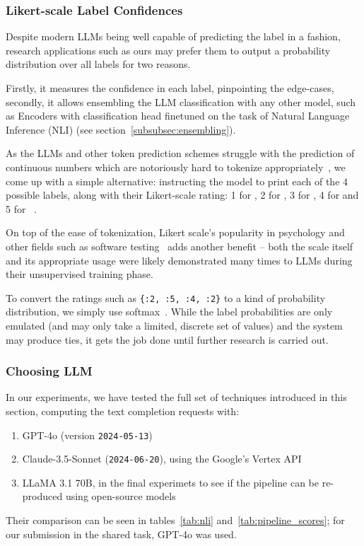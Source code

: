 \subsubsection{Likert-scale Label Confidences}
\label{likert}
Despite modern LLMs being well capable of predicting the label in a  fashion, research applications such as ours may prefer them to output a probability distribution over all labels for two reasons.

Firstly, it measures the confidence in each label, pinpointing the edge-cases, secondly, it allows ensembling the LLM classification with any other model, such as Encoders with classification head finetuned on the task of Natural Language Inference (NLI) (see section~\ref{subsubsec:ensembling}).

As the LLMs and other token prediction schemes struggle with the prediction of continuous numbers which are notoriously hard to tokenize appropriately~\cite{golkar2023xvalcontinuousnumberencoding}, we come up with a simple alternative: instructing the model to print each of the 4 possible labels, along with their Likert-scale rating: 1 for , 2 for , 3 for , 4 for  and 5 for ~\cite{likert1932technique}.

On top of the ease of tokenization, Likert scale's popularity in psychology and other fields such as software testing~\cite{likertstudy} adds another benefit -- both the scale itself and its appropriate usage were likely demonstrated many times to LLMs during their unsupervised training phase.

To convert the ratings such as \texttt{\{:2, :5, :4, :2\}} to a kind of probability distribution, we simply use softmax~\cite{NIPS1989_0336dcba}.
While the label probabilities are only emulated (and may only take a limited, discrete set of values) and the system may produce ties, it gets the job done until further research is carried out.

\subsubsection{Choosing LLM}
\label{sec:chosen_llms}
In our experiments, we have tested the full set of techniques introduced in this section, computing the text completion requests with:
\begin{enumerate}
    \item GPT-4o (version \texttt{2024-05-13})
    \item Claude-3.5-Sonnet (\texttt{2024-06-20}), using the Google's Vertex API
    \item LLaMA 3.1 70B, in the final experimets to see if the pipeline can be re-produced using open-source models
\end{enumerate} 

Their comparison can be seen in tables~\ref{tab:nli} and~\ref{tab:pipeline_scores}; for our submission in the \averitec{}  shared task, GPT-4o was used.
